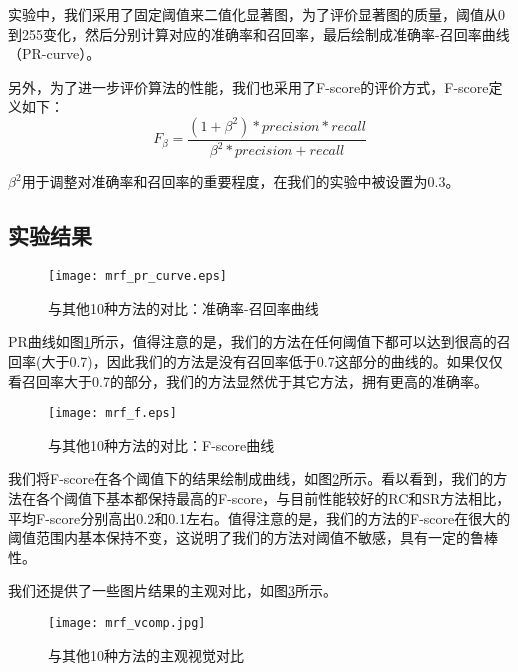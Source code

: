 实验中，我们采用了固定阈值来二值化显著图，为了评价显著图的质量，阈值从0到255变化，然后分别计算对应的准确率和召回率，最后绘制成准确率-召回率曲线（PR-curve）。

另外，为了进一步评价算法的性能，我们也采用了F-score的评价方式，F-score定义如下：
\begin{equation}
F_{\beta} = \frac{(1+\beta^2)*precision*recall}{\beta^2*precision+recall}
\end{equation}

$\beta^2$用于调整对准确率和召回率的重要程度，在我们的实验中被设置为0.3。

\subsection{实验结果}
\begin{figure}
\centering
\texttt{[image: mrf\_pr\_curve.eps]}
\caption{与其他10种方法的对比：准确率-召回率曲线}
\label{fig:results1_pr}
\end{figure}
PR曲线如图\ref{fig:results1_pr}所示，值得注意的是，我们的方法在任何阈值下都可以达到很高的召回率(大于0.7)，因此我们的方法是没有召回率低于0.7这部分的曲线的。如果仅仅看召回率大于0.7的部分，我们的方法显然优于其它方法，拥有更高的准确率。

\begin{figure}
\centering
\texttt{[image: mrf\_f.eps]}
\caption{与其他10种方法的对比：F-score曲线}
\label{fig:results1_fscore}
\end{figure}
我们将F-score在各个阈值下的结果绘制成曲线，如图\ref{fig:results1_fscore}所示。看以看到，我们的方法在各个阈值下基本都保持最高的F-score，与目前性能较好的RC和SR方法相比，平均F-score分别高出0.2和0.1左右。值得注意的是，我们的方法的F-score在很大的阈值范围内基本保持不变，这说明了我们的方法对阈值不敏感，具有一定的鲁棒性。

我们还提供了一些图片结果的主观对比，如图\ref{fig:vresult1}所示。
\begin{figure}[h]
\centering
\texttt{[image: mrf\_vcomp.jpg]}
\caption{与其他10种方法的主观视觉对比}\label{fig:vresult1}
\end{figure}